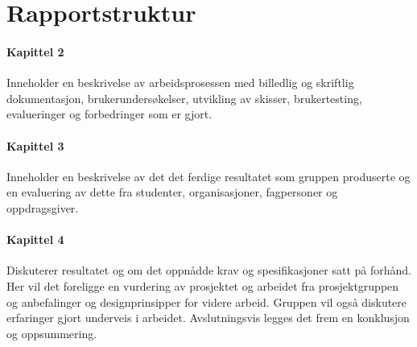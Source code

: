 \section{Rapportstruktur}
\paragraph{Kapittel 2} Inneholder en beskrivelse av arbeidsprosessen med billedlig og skriftlig dokumentasjon, brukerundersøkelser, utvikling av skisser, brukertesting, evalueringer og forbedringer som er gjort.

\paragraph{Kapittel 3}
Inneholder en beskrivelse av det det ferdige resultatet som gruppen produserte og en evaluering av dette fra studenter, organisasjoner, fagpersoner og oppdragsgiver.

\paragraph{Kapittel 4}
Diskuterer resultatet og om det oppnådde krav og spesifikasjoner satt på forhånd. Her vil det foreligge en vurdering av prosjektet og arbeidet fra prosjektgruppen og anbefalinger og designprinsipper for videre arbeid. Gruppen vil også diskutere erfaringer gjort underveis i arbeidet. Avslutningsvis legges det frem en konklusjon og oppsummering.


